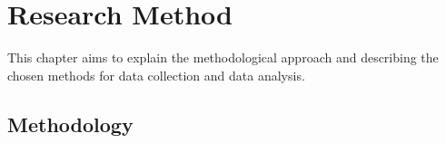 \chapter{Research Method}
This chapter aims to explain the methodological approach and describing the chosen methods for data collection and data analysis. 

\section{Methodology}





